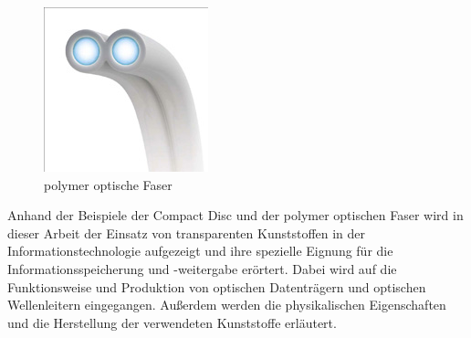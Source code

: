 {\begin{figure}[H]
\begin{center}
\begin{minipage}[t]{0.4\textwidth}
\begin{center}
                    \label{fig:compact-disc}
                \end{center}
            \end{minipage}
            \hspace{0.025\textwidth}
            \begin{minipage}[t]{0.4\textwidth}
                \begin{center}
                    \includegraphics[height=0.1\textheight]{Bilder/Einleitung/pof.png}
                    \caption[polymer optische Faser \newline \url{http://www.heise.de/tr/imgs/08/2/5/4/2/1/5/c337ef89957e0f2b.jpg} (zuletzt aufgerufen am 19.09.2015)]{polymer optische Faser}
                    \label{fig:pof}
                \end{center}
            \end{minipage}
        \end{center}
    \end{figure}
}{}

Anhand der Beispiele der Compact Disc und der polymer optischen Faser wird in
dieser Arbeit der Einsatz von transparenten Kunststoffen in der
Informationstechnologie aufgezeigt und ihre spezielle Eignung für die
Informationsspeicherung und -weitergabe erörtert. Dabei wird auf die
Funktionsweise und Produktion von optischen Datenträgern und optischen
Wellenleitern eingegangen. Außerdem werden die physikalischen Eigenschaften und
die Herstellung der verwendeten Kunststoffe erläutert.
